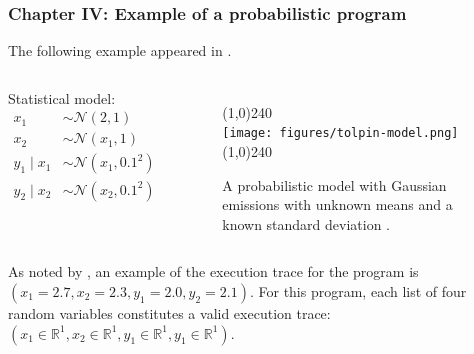 \documentclass[aspectratio=169]{beamer}
\begin{document}
\begin{frame}
    \frametitle{Chapter IV: Example of a probabilistic program}
    The following example appeared in \citep{tolpin2015probabilistic}. 
    \vspace{-0.7cm}
    \begin{columns}[c] 
        Statistical model:
        \begin{align*}
            x_1 &\sim \mathcal{N}(2,1) \\ 
            x_2 &\sim \mathcal{N}(x_1,1) \\
            y_1 \mid x_1 &\sim \mathcal{N}(x_1,0.1^2) \\
            y_2 \mid x_2 &\sim \mathcal{N}(x_2,0.1^2) 
        \end{align*}
        \begin{figure}[ht!]
            \line(1,0){240}\\
            \texttt{[image: figures/tolpin-model.png]}\\
            \vspace{-0.4cm}
            \line(1,0){240}\\
            \caption{A probabilistic model with Gaussian emissions with unknown means and a known standard deviation
                \citep{perov2016applications}.}
        \end{figure}
    \end{columns}
    As noted by \citet{perov2016applications}, an example of the execution trace for the program is $(x_1 = 2.7, x_2 =
    2.3, y_1 = 2.0, y_2 = 2.1)$. For this program, each list of four random variables constitutes a valid execution
    trace: $(x_1 \in  \mathbb{R}^1, x_2 \in \mathbb{R}^1, y_1 \in \mathbb{R}^1, y_1 \in \mathbb{R}^1)$.
\end{frame}
\end{document}
